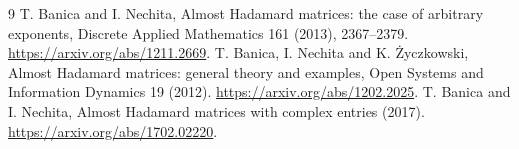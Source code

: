\documentclass[11pt]{article}
\begin{document}
\begin{thebibliography}{9}
 T. Banica and I. Nechita, Almost Hadamard matrices:
the case of arbitrary exponents, Discrete Applied Mathematics 161
(2013), 2367--2379. \url{https://arxiv.org/abs/1211.2669}.
 T. Banica, I. Nechita and K. \.{Z}yczkowski,
Almost Hadamard matrices: general theory and examples,
Open Systems and Information Dynamics 19 (2012).
\url{https://arxiv.org/abs/1202.2025}.
 T. Banica and I. Nechita,
Almost Hadamard matrices with complex entries (2017).
\url{https://arxiv.org/abs/1702.02220}.
\end{thebibliography}
\end{document}
